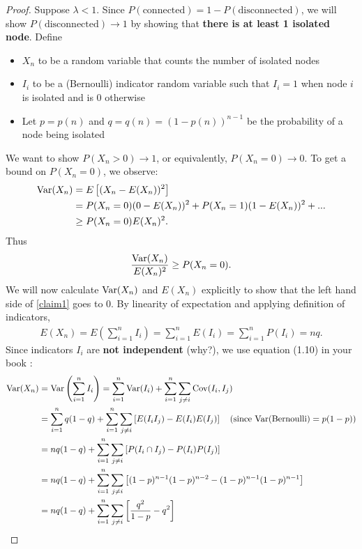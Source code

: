 \documentclass[./some_latex_template.tex]{subfiles}
\begin{document}
\begin{proof}
Suppose $\lambda < 1$. Since $P(\text{connected}) = 1 - P(\text{disconnected})$, we will show $P(\text{disconnected}) \rightarrow 1$ by showing that \textbf{there is at least 1 isolated node}. Define
\begin{itemize}
	\item $X_n$ to be a random variable that counts the number of isolated nodes
	\item $I_i$ to be a (Bernoulli) indicator random variable such that $I_i = 1$ when node $i$ is isolated and is $0$ otherwise
	\item Let $p = p(n)$ and $q = q(n) = (1 - p(n))^{n - 1}$ be  the probability of a node being isolated
\end{itemize}
We want to show $P(X_n > 0) \rightarrow 1$, or equivalently, $P(X_n = 0) \rightarrow 0$. To get a bound on $P(X_n = 0)$, we observe:
\begin{align*}
	\mathop{\rm Var}\nolimits(X_n) 
	&= E\left[(X_n - E(X_n))^2\right]\\
	&= P(X_n = 0)(0 - E(X_n))^2 + P(X_n = 1)(1 - E(X_n))^2 + ...\\
	&\ge P(X_n = 0)E(X_n)^2.
\end{align*}
Thus 
\begin{align}\label{claim1}
\frac{\mathop{\rm Var}\nolimits(X_n)}{E(X_n)^2} \ge P(X_n=0). 
\end{align}
We will now calculate $\mathop{\rm Var}\nolimits(X_n)$ and $E(X_n)$ explicitly to show that the left hand side of \eqref{claim1} goes to 0. By linearity of expectation and applying definition of indicators,
\begin{align*}
	E(X_n) = E\left(\sum_{i=1}^n I_i\right) = \sum_{i=1}^nE(I_i) = \sum_{i=1}^nP(I_i) = nq.
\end{align*}
Since indicators $I_i$ are \textbf{not independent} (why?), we use equation (1.10) in your book \cite{lange2010applied}:
\begin{align*}
	\Var(X_n) 
	&= \Var\left(\sum_{i=1}^nI_i\right) = \sum_{i=1}^n\Var(I_i) + \sum_{i=1}^n\sum_{j\neq i} \Cov(I_i, I_j)\\
	&= \sum_{i=1}^n q(1-q) + \sum_{i=1}^n \sum_{j\neq i}\left[ E(I_iI_j) - E(I_i)E(I_j) \right] \quad (\text{since Var(Bernoulli)} = p(1-p))\\
	&= nq(1-q) + \sum_{i=1}^n \sum_{j\neq i}\left[ P(I_i \cap I_j) - P(I_i)P(I_j) \right]\\
	&= nq(1-q) + \sum_{i=1}^n\sum_{j\neq i}\left[ (1-p)^{n-1}(1-p)^{n-2} - (1-p)^{n-1}(1-p)^{n-1} \right]\\
	&= nq(1-q) + \sum_{i=1}^n\sum_{j\neq i}\left[ \frac{q^2}{1-p} - q^2 \right]\\

\end{align*}
\end{proof}
\end{document}
